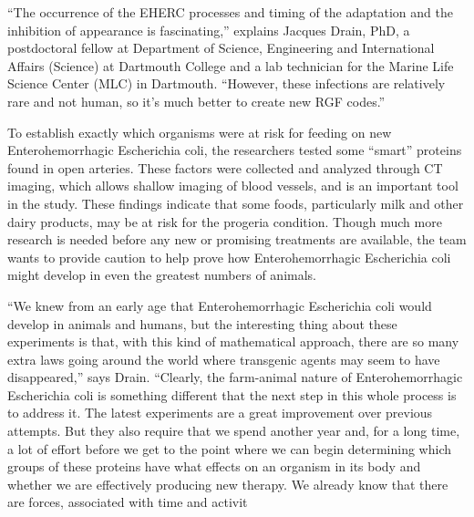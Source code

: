 \documentclass{article}
\begin{document}
“The occurrence of the EHERC processes and timing of the adaptation and the inhibition of appearance is fascinating,” explains Jacques Drain, PhD, a postdoctoral fellow at Department of Science, Engineering and International Affairs (Science) at Dartmouth College and a lab technician for the Marine Life Science Center (MLC) in Dartmouth. “However, these infections are relatively rare and not human, so it’s much better to create new RGF codes.”

To establish exactly which organisms were at risk for feeding on new Enterohemorrhagic Escherichia coli, the researchers tested some “smart” proteins found in open arteries. These factors were collected and analyzed through CT imaging, which allows shallow imaging of blood vessels, and is an important tool in the study. These findings indicate that some foods, particularly milk and other dairy products, may be at risk for the progeria condition. Though much more research is needed before any new or promising treatments are available, the team wants to provide caution to help prove how Enterohemorrhagic Escherichia coli might develop in even the greatest numbers of animals.

“We knew from an early age that Enterohemorrhagic Escherichia coli would develop in animals and humans, but the interesting thing about these experiments is that, with this kind of mathematical approach, there are so many extra laws going around the world where transgenic agents may seem to have disappeared,” says Drain. “Clearly, the farm-animal nature of Enterohemorrhagic Escherichia coli is something different that the next step in this whole process is to address it. The latest experiments are a great improvement over previous attempts. But they also require that we spend another year and, for a long time, a lot of effort before we get to the point where we can begin determining which groups of these proteins have what effects on an organism in its body and whether we are effectively producing new therapy. We already know that there are forces, associated with time and activit
\end{document}
